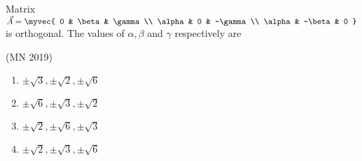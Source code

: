 \item Matrix 
$\vec{A}=
\myvec{
0 & \beta & \gamma \\
\alpha & 0 & -\gamma \\
\alpha & -\beta & 0
}
$ is orthogonal. The values of $\alpha, \beta$ and $\gamma$ respectively are

\hfill(MN 2019)
\begin{multicols}{2}
\begin{enumerate}
  \item $\pm \sqrt{3}, \pm \sqrt{2}, \pm \sqrt{6}$
  \item $\pm \sqrt{6}, \pm \sqrt{3}, \pm \sqrt{2}$
  \item $\pm \sqrt{2}, \pm \sqrt{6}, \pm \sqrt{3}$
  \item $\pm \sqrt{2}, \pm \sqrt{3}, \pm \sqrt{6}$
\end{enumerate}
\end{multicols}

